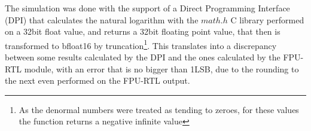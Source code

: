 \documentclass{report}
\begin{document}
The simulation was done with the support of a Direct Programming Interface (DPI) that calculates the natural logarithm with the $math.h$ C library performed on a 32bit float value, and returns a 32bit floating point value, that then is transformed to bfloat16 by truncation\footnote{As the denormal numbers were treated as tending to zeroes, for these values the function returns a negative infinite value}. This translates into a discrepancy between some results calculated by the DPI and the ones calculated by the FPU-RTL module, with an error that is no bigger than 1LSB, due to the rounding to the next even performed on the FPU-RTL output.
\end{document}
